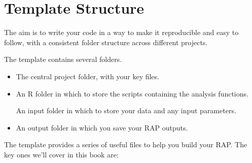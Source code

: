 \documentclass[
  letterpaper,
]{book}
\begin{document}
\hypertarget{template-structure}{%
\section{Template Structure}\label{template-structure}}

The aim is to write your code in a way to make it reproducible and easy
to follow, with a consistent folder structure across different projects.

The template contains several folders.

\begin{itemize}
\item
  The central project folder, with your key files.
\item
  An R folder in which to store the scripts containing the analysis
  functions.

  An input folder in which to store your data and any input parameters.
\item
  An output folder in which you save your RAP outputs.
\end{itemize}

The template provides a series of useful files to help you build your
RAP. The key ones we'll cover in this book are:
\end{document}
